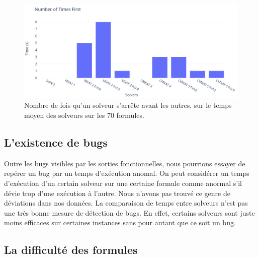\documentclass[11pt,a4paper]{article}
\begin{document}
\begin{figure}
  \includegraphics[width=0.6\linewidth]{plot-first.png}
  \caption{Nombre de fois qu'un solveur s'arrête avant les autres, sur le temps moyen des solveurs sur les 70 formules.}
  \label{fig:first}
\end{figure}

\subsection{L'existence de bugs}
 
Outre les bugs visibles par les sorties fonctionnelles, nous pourrions essayer de repérer un bug par un temps d'exécution anomal. On peut considérer un temps d'exécution d'un certain solveur sur une certaine formule comme anormal s'il dévie trop d'une exécution à l'autre. Nous n'avons pas trouvé ce genre de déviations dans nos données. 
La comparaison de temps entre solveurs n'est pas une très bonne mesure de détection de bugs. En effet, certains solveurs sont juste moins efficaces sur certaines instances sans pour autant que ce soit un bug.


\subsection{La difficulté des formules}
\end{document}
